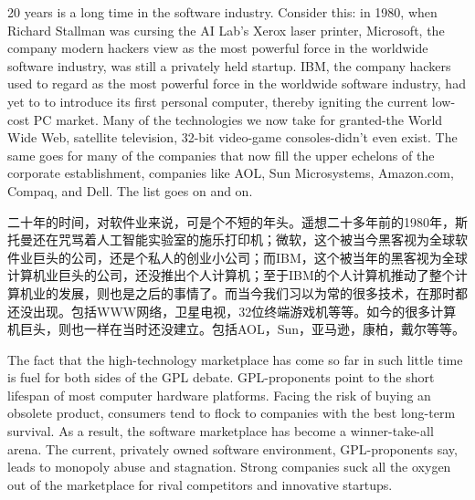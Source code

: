 

\ifdefined\eng
20 years is a long time in the software industry. Consider this: in 1980, when Richard Stallman was cursing the AI Lab's Xerox laser printer, Microsoft, the company modern hackers view as the most powerful force in the worldwide software industry, was still a privately held startup. IBM, the company hackers used to regard as the most powerful force in the worldwide software industry, had yet to to introduce its first personal computer, thereby igniting the current low-cost PC market. Many of the technologies we now take for granted-the World Wide Web, satellite television, 32-bit video-game consoles-didn't even exist. The same goes for many of the companies that now fill the upper echelons of the corporate establishment, companies like AOL, Sun Microsystems, Amazon.com, Compaq, and Dell. The list goes on and on.
\fi

\ifdefined\chs
二十年的时间，对软件业来说，可是个不短的年头。遥想二十多年前的1980年，斯托曼还在咒骂着人工智能实验室的施乐打印机；微软，这个被当今黑客视为全球软件业巨头的公司，还是个私人的创业小公司；而IBM，这个被当年的黑客视为全球计算机业巨头的公司，还没推出个人计算机；至于IBM的个人计算机推动了整个计算机业的发展，则也是之后的事情了。而当今我们习以为常的很多技术，在那时都还没出现。包括WWW网络，卫星电视，32位终端游戏机等等。如今的很多计算机巨头，则也一样在当时还没建立。包括AOL，Sun，亚马逊，康柏，戴尔等等。
\fi

\ifdefined\eng
The fact that the high-technology marketplace has come so far in such little time is fuel for both sides of the GPL debate. GPL-proponents point to the short lifespan of most computer hardware platforms. Facing the risk of buying an obsolete product, consumers tend to flock to companies with the best long-term survival. As a result, the software marketplace has become a winner-take-all arena. The current, privately owned software environment, GPL-proponents say, leads to monopoly abuse and stagnation. Strong companies suck all the oxygen out of the marketplace for rival competitors and innovative startups.
\fi

